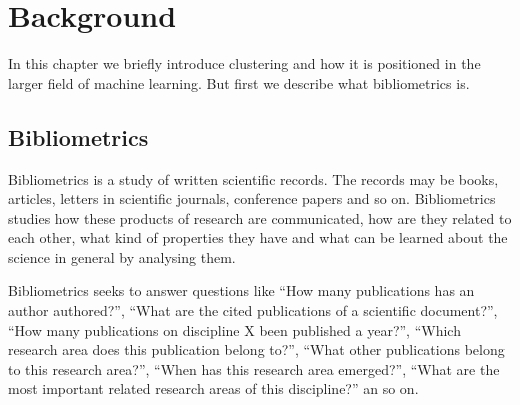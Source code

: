 \chapter{Background}
\label{chapter:background}

% 


In this chapter we briefly introduce clustering and how it is 
positioned in the larger field of machine learning. But first we
describe what bibliometrics is.

\section{Bibliometrics}
\label{sec:bibliometrics}
Bibliometrics is a study of written scientific records. The 
records may be books, articles, letters in scientific journals, 
conference papers and so on. Bibliometrics studies how these 
products of research are communicated, how are they related to 
each other, what kind of properties they have and what can be 
learned about the science in general by analysing them.

Bibliometrics seeks to answer questions like ``How many 
publications has an author authored?'', ``What are the 
cited publications of a scientific document?'', ``How many
publications
on discipline X been published a year?'', ``Which research area
does this publication belong to?'', ``What other publications 
belong to this research area?'', ``When has this research area
emerged?'', ``What are the most important related research areas
of this discipline?'' an so on. 

